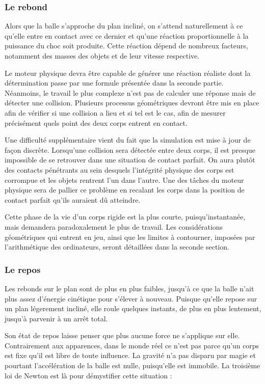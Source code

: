 \subsubsection{Le rebond}

Alors que la balle s'approche du plan incliné, on s'attend
naturellement à ce qu'elle entre en contact avec ce dernier et qu'une
réaction proportionnelle à la puissance du choc soit produite. Cette
réaction dépend de nombreux facteurs, notamment des masses des objets
et de leur vitesse respective.

Le moteur physique devra être capable de générer une réaction réaliste
dont la détermination passe par une formule présentée dans la seconde
partie. Néanmoins, le travail le plus complexe n'est pas de calculer
une réponse mais de détecter une collision. Plusieurs processus
géométriques devront être mis en place afin de vérifier si une
collision a lieu et si tel est le cas, afin de mesurer précisément
quels point des deux corps entrent en contact.

Une difficulté supplémentaire vient du fait que la simulation est mise
à jour de façon discrète. Lorsqu'une collision sera détectée entre
deux corps, il est presque impossible de se retrouver dans une
situation de contact parfait. On aura plutôt des contacts pénétrants
au sein desquels l'intégrité physique des corps est corrompue et les
objets rentrent l'un dans l'autre. Une des tâches du moteur physique
sera de pallier ce problème en recalant les corps dans la position de
contact parfait qu'ils auraient dû atteindre.

Cette phase de la vie d'un corps rigide est la plus courte,
puisqu'instantanée, mais demandera paradoxalement le plus de
travail. Les considérations géométriques qui entrent en jeu, ainsi que
les limites à contourner, imposées par l'arithmétique des ordinateurs,
seront détaillées dans la seconde section.

\subsubsection{Le repos}

Les rebonds sur le plan sont de plus en plus faibles, jusqu'à ce que
la balle n'ait plus assez d'énergie cinétique pour s'élever à
nouveau. Puisque qu'elle repose sur un plan légerement incliné, elle
roule quelques instants, de plus en plus lentement, jusqu'à parvenir à
un arrêt total.

Son état de repos laisse penser que plus aucune force ne s'applique
sur elle. Contrairement aux apparences, dans le monde réel ce n'est
pas parce qu'un corps est fixe qu'il est libre de toute influence. La
gravité n'a pas disparu par magie et pourtant l'accélération de la
balle est nulle, puisqu'elle est immobile. La troisième loi de Newton
est là pour démystifier cette situation :

